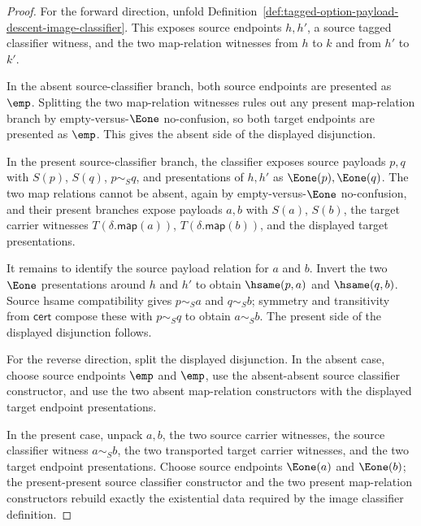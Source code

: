 \begin{proof}
For the forward direction, unfold
Definition~\ref{def:tagged-option-payload-descent-image-classifier}. This
exposes source endpoints $h,h'$, a source tagged classifier witness, and the two
map-relation witnesses from $h$ to $k$ and from $h'$ to $k'$.

In the absent source-classifier branch, both source endpoints are presented as
$\emp$. Splitting the two map-relation witnesses rules out any present
map-relation branch by empty-versus-$\Eone$ no-confusion, so both target
endpoints are presented as $\emp$. This gives the absent side of the displayed
disjunction.

In the present source-classifier branch, the classifier exposes source payloads
$p,q$ with $S(p)$, $S(q)$, $p\sim_S q$, and presentations of $h,h'$ as
$\Eone(p),\Eone(q)$. The two map relations cannot be absent, again by
empty-versus-$\Eone$ no-confusion, and their present branches expose payloads
$a,b$ with $S(a)$, $S(b)$, the target carrier witnesses
$T(\delta.\mathsf{map}(a))$, $T(\delta.\mathsf{map}(b))$, and the displayed
target presentations.

It remains to identify the source payload relation for $a$ and $b$. Invert the
two $\Eone$ presentations around $h$ and $h'$ to obtain $\hsame(p,a)$ and
$\hsame(q,b)$. Source hsame compatibility gives $p\sim_S a$ and $q\sim_S b$;
symmetry and transitivity from $\mathsf{cert}$ compose these with
$p\sim_S q$ to obtain $a\sim_S b$. The present side of the displayed
disjunction follows.

For the reverse direction, split the displayed disjunction. In the absent case,
choose source endpoints $\emp$ and $\emp$, use the absent-absent source
classifier constructor, and use the two absent map-relation constructors with
the displayed target endpoint presentations.

In the present case, unpack $a,b$, the two source carrier witnesses, the source
classifier witness $a\sim_S b$, the two transported target carrier witnesses,
and the two target endpoint presentations. Choose source endpoints $\Eone(a)$
and $\Eone(b)$; the present-present source classifier constructor and the two
present map-relation constructors rebuild exactly the existential data required
by the image classifier definition.
\end{proof}

